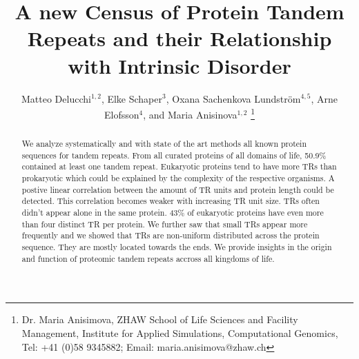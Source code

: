 \documentclass[a4,center,fleqn]{NAR}
\begin{document}
\title{A new Census of Protein Tandem Repeats and their Relationship with Intrinsic Disorder}

\author{%
Matteo Delucchi$^{1,2}$,
Elke Schaper$^{3}$,
Oxana Sachenkova Lundstr\"om$^{4,5}$,
Arne Elofsson$^{4}$,
and Maria Anisinova$^{1,2}$
\footnote{Dr. Maria Anisimova, ZHAW School of Life Sciences and Facility Management, Institute for Applied Simulations, Computational Genomics, Tel: +41 (0)58 9345882; Email: maria.anisimova@zhaw.ch}}

\address{%
$^{1}$, ZHAW W\"adenswil, Switzerland 
$^{2}$, Swiss Institute of Bioinformatics, Lausanne, Switzerland 
$^{3}$, Currently at Carbon Delta AG, Switzerland 
$^{4}$, Stockholm University, Stockholm, Sweden 
$^{5}$, Currently at Aiwizo AB, Stockholm, Sweden   
}


\maketitle

\begin{abstract} %
We analyze systematically and with state of the art methods all known protein sequences for tandem repeats.
From all curated proteins of all domains of life, 50.9\% contained at least one tandem repeat. Eukaryotic proteins tend to have more TRs than prokaryotic which could be explained by the complexity of the respective organisms. 
A postive linear correlation between the amount of TR units and protein length could be detected. This correlation becomes weaker with increasing TR unit size.
TRs often didn't appear alone in the same protein. 43\% of eukaryotic proteins have even more than four distinct TR per protein. We further saw that small TRs appear more frequently and we showed that TRs are non-uniform distributed across the protein sequence. They are mostly located towards the ends.
We provide insights in the origin and function of proteomic tandem repeats accross all kingdoms of life.
\end{abstract}
\end{document}

